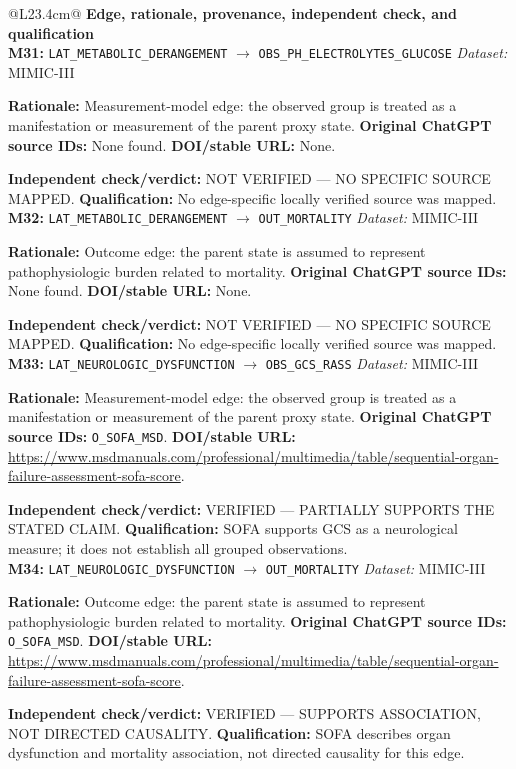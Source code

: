 \begin{tabular}{@{}L{23.4cm}@{}}
\toprule
\textbf{Edge, rationale, provenance, independent check, and qualification}\\
\midrule
\textbf{M31:} \nolinkurl{LAT_METABOLIC_DERANGEMENT} $\rightarrow$ \nolinkurl{OBS_PH_ELECTROLYTES_GLUCOSE} \hfill \textit{Dataset:} MIMIC-III\par\textbf{Rationale:} Measurement-model edge: the observed group is treated as a manifestation or measurement of the parent proxy state. \textbf{Original ChatGPT source IDs:} None found. \textbf{DOI/stable URL:} None.\par\textbf{Independent check/verdict:} NOT VERIFIED --- NO SPECIFIC SOURCE MAPPED. \textbf{Qualification:} No edge-specific locally verified source was mapped. \\
\addlinespace[2pt]
\midrule
\textbf{M32:} \nolinkurl{LAT_METABOLIC_DERANGEMENT} $\rightarrow$ \nolinkurl{OUT_MORTALITY} \hfill \textit{Dataset:} MIMIC-III\par\textbf{Rationale:} Outcome edge: the parent state is assumed to represent pathophysiologic burden related to mortality. \textbf{Original ChatGPT source IDs:} None found. \textbf{DOI/stable URL:} None.\par\textbf{Independent check/verdict:} NOT VERIFIED --- NO SPECIFIC SOURCE MAPPED. \textbf{Qualification:} No edge-specific locally verified source was mapped. \\
\addlinespace[2pt]
\midrule
\textbf{M33:} \nolinkurl{LAT_NEUROLOGIC_DYSFUNCTION} $\rightarrow$ \nolinkurl{OBS_GCS_RASS} \hfill \textit{Dataset:} MIMIC-III\par\textbf{Rationale:} Measurement-model edge: the observed group is treated as a manifestation or measurement of the parent proxy state. \textbf{Original ChatGPT source IDs:} \nolinkurl{O_SOFA_MSD}. \textbf{DOI/stable URL:} \url{https://www.msdmanuals.com/professional/multimedia/table/sequential-organ-failure-assessment-sofa-score}.\par\textbf{Independent check/verdict:} VERIFIED --- PARTIALLY SUPPORTS THE STATED CLAIM. \textbf{Qualification:} SOFA supports GCS as a neurological measure; it does not establish all grouped observations. \\
\addlinespace[2pt]
\midrule
\textbf{M34:} \nolinkurl{LAT_NEUROLOGIC_DYSFUNCTION} $\rightarrow$ \nolinkurl{OUT_MORTALITY} \hfill \textit{Dataset:} MIMIC-III\par\textbf{Rationale:} Outcome edge: the parent state is assumed to represent pathophysiologic burden related to mortality. \textbf{Original ChatGPT source IDs:} \nolinkurl{O_SOFA_MSD}. \textbf{DOI/stable URL:} \url{https://www.msdmanuals.com/professional/multimedia/table/sequential-organ-failure-assessment-sofa-score}.\par\textbf{Independent check/verdict:} VERIFIED --- SUPPORTS ASSOCIATION, NOT DIRECTED CAUSALITY. \textbf{Qualification:} SOFA describes organ dysfunction and mortality association, not directed causality for this edge. \\

\end{tabular}
